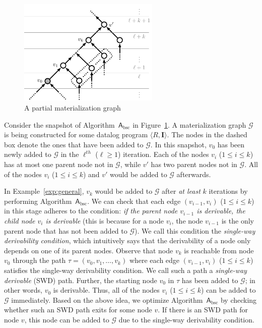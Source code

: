 \begin{figure}[htbp]
\begin{center}
\includegraphics[width=0.6\textwidth]{fig-general.pdf}
\caption{A partial materialization graph}
\label{fig:general}
\end{center}
\end{figure}

\begin{example}\label{exp:general}
Consider the  snapshot of Algorithm~$\mathsf{A}_{\text{bsc}}$ in
Figure~\ref{fig:general}. A materialization graph $\mathcal{G}$
is being constructed for some datalog program $\langle R, \textbf{I}\rangle$.
The nodes in the dashed box denote the ones that have been added to $\mathcal{G}$.
In this snapshot, $v_0$ has been newly added
to $\mathcal{G}$ in the $\ell^{th}$ ($\ell\geq 1$) iteration.
Each of the nodes $v_i$ ($1\leq i\leq k$) has at most one parent node not in $\mathcal{G}$,
while $v'$ has two parent nodes not in $\mathcal{G}$.
All of the nodes $v_i$ ($1\leq i\leq k$) and $v'$ would be added to $\mathcal{G}$
afterwards.
\end{example}


In Example~\ref{exp:general}, $v_k$ would be added to $\mathcal{G}$ after \emph{at least} $k$
iterations by performing Algorithm~$\mathsf{A}_{\text{bsc}}$.
We can check that each edge $(v_{i-1},v_i)$ ($1\leq i\leq k$) in this
stage adheres to the condition:
\emph{if the parent node $v_{i-1}$ is derivable, the child node $v_i$ is derivable} (this
is because for a node $v_i$, the node $v_{i-1}$ is the only parent node that has not been added to $\mathcal{G}$).
We call this condition the \emph{single-way derivability condition}, which intuitively says that the derivability of a
node only depends on one of its parent nodes.
Observe that node $v_k$ is reachable from node $v_0$ through the path $\tau=(v_0,v_1,\ldots,v_k)$ where
each edge $(v_{i-1},v_i)$ ($1\leq i\leq k$) satisfies the single-way derivability condition.
We call such a path a \emph{single-way derivable} (SWD) path.
Further, the starting node $v_0$ in $\tau$ has been added to $\mathcal{G}$; in other words,
$v_0$ is derivable. Thus, all of the nodes $v_i$ ($1\leq i\leq k$) can be added to
$\mathcal{G}$ immediately.
Based on the above idea, we optimize Algorithm~$\mathsf{A}_{\text{bsc}}$ by checking whether such an SWD path
exits for some node $v$. If there is an SWD path for node $v$, this node can be added to $\mathcal{G}$
due to the single-way derivability condition.

